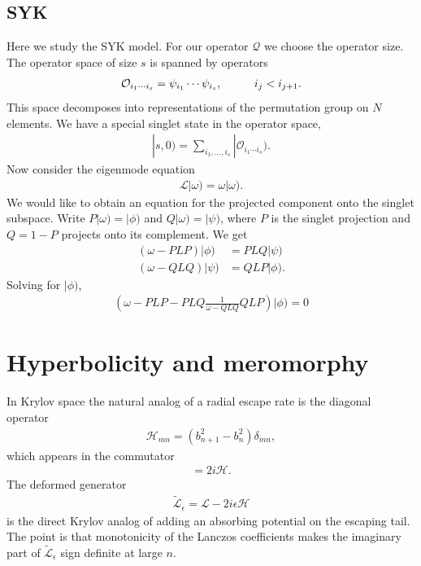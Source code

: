 \documentclass[JHEP,12pt]{article}
\begin{document}
\subsection{SYK}
Here we study the SYK model. For our operator $\mathcal{Q}$ we choose the operator size. The operator space of size $s$ is spanned by operators 
\begin{align}
\mathcal{O}_{i_1\cdots i_s}=\psi_{i_1}\cdots \psi_{i_s},\hspace{10 mm}i_j<i_{j+1}.
\end{align}
This space decomposes into representations of the permutation group on $N$ elements. We have a special singlet state in the operator space, 
\begin{align}
|s,0)=\sum_{i_1,\ldots,i_s}|\mathcal{O}_{i_1\cdots i_s}).
\end{align}
\indent Now consider the eigenmode equation 
\begin{align}
\mathcal{L}|\omega)=\omega |\omega).
\end{align}
We would like to obtain an equation for the projected component onto the singlet subspace. Write $P|\omega)=|\phi)$ and $Q|\omega)=|\psi)$, where $P$ is the singlet projection and $Q=1-P$ projects onto its complement. We get
\begin{align}
(\omega-PLP)|\phi)&=PLQ|\psi)\\
(\omega-QLQ)|\psi)&=QLP|\phi).
\end{align}
Solving for $|\phi)$, 
\begin{align}
\left(\omega-PLP-PLQ\frac{1}{\omega-QLQ}QLP\right)|\phi)=0
\end{align}

\section{Hyperbolicity and meromorphy}
In Krylov space the natural analog of a radial escape rate is the diagonal operator
\begin{align}
\mathcal{H}_{mn}=(b_{n+1}^2-b_n^2)\delta_{mn},
\end{align}
which appears in the commutator
\begin{align}
[\mathcal{L},\mathcal{P}]=2i\mathcal{H}.
\end{align}
The deformed generator
\begin{align}
\widetilde{\mathcal{L}}_\epsilon=\mathcal{L}-2i\epsilon \mathcal{H}
\end{align}
is the direct Krylov analog of adding an absorbing potential on the escaping tail. The point is that monotonicity of the Lanczos coefficients makes the imaginary part of $\widetilde{\mathcal{L}}_\epsilon$ sign definite at large $n$.
\end{document}
